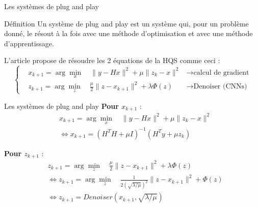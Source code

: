 \documentclass[11pt]{beamer}
\begin{document}
\begin{frame}{Les systèmes de plug and play}
    \begin{exampleblock}{Définition}
        Un système de plug and play est un système qui, pour un problème donné, le résout
        à la fois avec une méthode d'optimisation et avec une méthode d'apprentissage.
    \end{exampleblock}

    L'article propose de résoudre les 2 équations de la HQS comme ceci :
    \begin{equation*}
        \left\{
        \begin{aligned}
            & x_{k+1} = \arg \min_x \quad \lVert y - Hx \rVert^2 + \mu \lVert z_k - x \rVert^2 &  \rightarrow \text{calcul de gradient}\\
            & z_{k+1} = \arg \min_z \quad \frac{\mu}{2}\lVert z - x_{k+1} \rVert^2 + \lambda \Phi(z) & \rightarrow \text{Denoiser (CNNs)}
        \end{aligned}
        \right.
    \end{equation*}
\end{frame}


\begin{frame}{Les systèmes de plug and play}
    \textbf{Pour $x_{k+1}$} :
    \begin{align*}
        & x_{k+1} = \arg \min_x \quad \lVert y - Hx \rVert ^2 + \mu \lVert z_k - x \rVert ^2 \\
        & \Leftrightarrow x_{k+1} = (H^TH + \mu I)^{-1} (H^Ty + \mu z_k)
    \end{align*}

    \textbf{Pour $z_{k+1}$} :
    \begin{align*}
        & z_{k+1} = \arg \min_z \quad \frac{\mu}{2}\lVert z - x_{k+1} \rVert^2 + \lambda \Phi(z) \\
        & \Leftrightarrow z_{k+1} = \arg \min_z \quad \frac{1}{2 (\sqrt{\lambda / \mu}) ^2}\lVert z - x_{k+1} \rVert^2 + \Phi(z) \\
        & \Leftrightarrow z_{k+1} = Denoiser(x_{k+1}, \sqrt{\lambda / \mu})
    \end{align*}
\end{frame}
\end{document}

